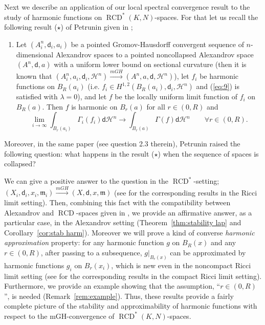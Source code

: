 \documentclass[a4paper,11pt,reqno]{article}
\numberwithin{equation}{section}
\theoremstyle{plain}
\theoremstyle{definition}
\theoremstyle{remark}
\newcommand{\dist}{\mathsf{d}}
\newcommand{\meas}{\mathfrak{m}}
\DeclareMathOperator{\RCD}{RCD}
\begin{document}
Next we describe an application of our local spectral convergence result to the study of harmonic functions on $\RCD^*(K, N)$-spaces.
For that let us recall the following result ($\star$) of Petrunin given in \cite{Petrunin2} ;
\begin{enumerate}
\item[($\star$)] Let $(A_i^n, \dist_i, a_i)$ be a pointed Gromov-Hausdorff convergent sequence 
of $n$-dimensional Alexandrov spaces to a pointed noncollapsed 
Alexandrov space $(A^n, \dist, a)$ with a uniform lower bound on sectional curvature (then it is known that $(A_i^n, a_i, \dist_i, \mathcal{H}^n) \stackrel{mGH}{\to} (A^n, a, \dist, \mathcal{H}^n)$), let $f_i$ be harmonic functions on $B_R(a_i)$ 
(i.e. $f_i \in H^{1, 2}(B_R(a_i), \dist_i, \mathcal{H}^n)$ and (\ref{eq:9}) is satisfied with $\lambda=0$), 
and let $f$ be the locally uniform limit function of $f_i$ on $B_R(a)$. 
Then $f$ is harmonic on $B_r(a)$ for all $r\in (0,R)$ and
$$
\lim_{i \to \infty}\int_{B_r(a_i)}\Gamma_i(f_i)\dist \mathcal{H}^n \to \int_{B_r(a)}\Gamma(f)\dist \mathcal{H}^n
\qquad\forall r\in (0,R).
$$
\end{enumerate}
Moreover, in the same paper (see question 2.3 therein), Petrunin raised the following question: 
what happens in the result ($\star$) when the sequence of spaces is collapsed?

We can give a positive answer to the question in the $\RCD^*$-setting; $(X_i, \dist_i, x_i, \meas_i) \stackrel{mGH}{\to} (X, \dist, x, \meas)$ (see \cite{Honda2} for the corresponding results in the Ricci limit setting).
Then, combining this fact with the compatibility between Alexandrov and $\RCD$-spaces given in \cite{Petrunin, ZhangZhu}, we provide
an affirmative answer, as a particular case, in the Alexandrov setting (Theorem~\ref{thm:stability lap} and Corollary~\ref{cor:stab harm}). Moreover we will prove a kind
of  converse \textit{harmonic approximation} property: for any harmonic function $g$ on $B_R(x)$ and any $r \in (0, R)$, after passing to a subsequence, $g\vert_{B_r(x)}$ can be approximated by harmonic functions $g_i$ on $B_r(x_i)$, which is new even in the noncompact Ricci limit setting (see \cite{Honda3} for the corresponding results in the compact Ricci limit setting). 
Furthermore, we provide an example showing that the assumption, ``$r \in (0, R)$'', is needed (Remark~\ref{rem:example}).
Thus, these results provide a fairly complete picture of the stability and approximability of harmonic functions with respect to 
the mGH-convergence of $\RCD^*(K, N)$-spaces.
\end{document}
